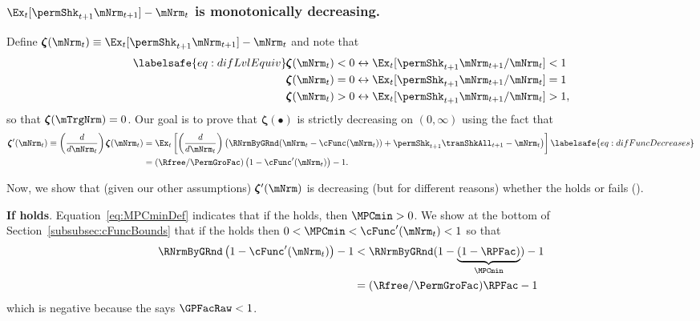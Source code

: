 \documentclass[\econtexRoot/BufferStockTheory]{subfiles}
\begin{document}
\subsubsection{\texorpdfstring{$\Ex_{t}[\permShk_{t+1}\mNrm_{t+1}] -\mNrm_t$}{PermShk m{t+1} --- m{t}} is monotonically decreasing.}

Define \providecommand{\difFunc}{\pmb{\zeta}} $\difFunc(\mNrm_t) \equiv 
\Ex_t[\permShk_{t+1}\mNrm_{t+1}] - \mNrm_t$ and note that
\begin{align}\labelsafe{eq:difLvlEquiv}
  \difFunc(\mNrm_t) < 0 &\leftrightarrow \Ex_t[\permShk_{t+1}\mNrm_{t+1}/\mNrm_{t}] < 1 
                          \nonumber\\
  \difFunc(\mNrm_t) = 0 &\leftrightarrow \Ex_t[\permShk_{t+1}\mNrm_{t+1}/\mNrm_{t}] = 1\\
  \difFunc(\mNrm_t) > 0 &\leftrightarrow \Ex_t[\permShk_{t+1}\mNrm_{t+1}/\mNrm_{t}] > 
                          1,\nonumber
\end{align}
so that $\difFunc(\mTrgNrm)=0$.
Our goal is to prove that $\difFunc(\bullet)$ is strictly 
decreasing on $(0,\infty)$ using the fact that
\begin{align}
  \difFunc^{\prime}(\mNrm_{t}) \equiv  \left( \frac{d}{d\mNrm_{t}}\right) \difFunc(\mNrm_t)  & = \Ex_{t}\left[
                                                                                               \left( \frac{d}{d\mNrm_{t}}\right) \left( 
                                                                                               {\RNrmByGRnd}(\mNrm_{t}-\cFunc(\mNrm_{t}))+%
                                                                                               {\permShk}_{t+1}{\tranShkAll}_{t+1} - {\mNrm}_t\right) \right] \labelsafe{eq:difFuncDecreases} \\
                                                                                             & = (\Rfree/\PermGroFac)\left(1-\cFunc^{\prime}({\mNrm}_t)\right) - 1.  \notag
\end{align}

Now, we show that (given our other assumptions) $\difFunc^{\prime}(\mNrm)$ is decreasing (but for different reasons) whether the {\RIC} holds or fails (\cncl{\RIC}).

\textbf{If {\RIC} holds}.
Equation~\eqref{eq:MPCminDef} indicates that if the {\RIC} holds, then $\MPCmin >0$.
We show at the bottom of Section~\ref{subsubsec:cFuncBounds} that if the {\RIC} holds then $0 < \MPCmin < \cFunc^{\prime}(\mNrm_{t}) < 1$ so that 
\begin{align*}
  \RNrmByGRnd\left(1-\cFunc^{\prime}({\mNrm}_t)\right) - 1 & <  \RNrmByGRnd(1-\underbrace{(1-\RPFac)}_{\MPCmin}) - 1  \\
                                                      & = (\Rfree/\PermGroFac)\RPFac - 1 
\end{align*}
which is negative because the {\GICRaw} says $\GPFacRaw < 1$.
\end{document}
